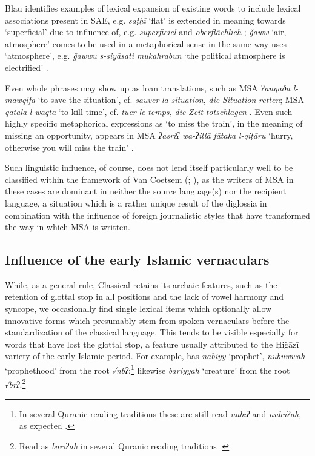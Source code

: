 \documentclass[output=paper]{langsci/langscibook}
\begin{document}
Blau identifies examples of lexical expansion of existing words to include lexical associations present in SAE, e.g. \textit{saṭḥī} ‘flat’ is extended in meaning towards ‘superficial’ due to influence of, e.g.   \textit{superficiel} and  \textit{oberflächlich} \citep[65]{Blau1969}; \textit{ǧaww} ‘air, atmosphere’ comes to be used in a metaphorical sense in the same way  uses ‘atmosphere’, e.g. \textit{ǧawwu} \textit{s-siyāsati} \textit{mukahrabun} ‘the political atmosphere is electrified’ \citep[69]{Blau1969}.

Even whole phrases may show up as loan translations, such as MSA \textit{ʔanqaða} \textit{l-mawqifa} ‘to save the situation’, cf.  \textit{sauver} \textit{la} \textit{situation},  \textit{die} \textit{Situation} \textit{retten}; MSA \textit{qatala} \textit{l-waqta} ‘to kill time’, cf.  \textit{tuer} \textit{le} \textit{temps,}  \textit{die} \textit{Zeit} \textit{totschlagen} \citep[76]{Blau1969}. Even such highly specific metaphorical expressions as ‘to miss the train’, in the meaning of missing an opportunity, appears in MSA \textit{ʔasriʕ} \textit{wa-ʔillā} \textit{fātaka} \textit{l-qiṭāru} ‘hurry, otherwise you will miss the train’ \citep[101]{Blau1969}.

Such linguistic influence, of course, does not lend itself particularly well to be classified within the framework of Van Coetsem (\citeyear{VanCoetsem1988}; \citeyear{VanCoetsem2000}), as the writers of MSA in these cases are dominant in neither the {source language}(s) nor the {recipient language}, a situation which is a rather unique result of the  {diglossia} in combination with the influence of foreign journalistic styles that have transformed the way in which MSA is written.

\subsection{\label{bkm:Ref13224870}Influence of the early Islamic vernaculars}

While, as a general rule, Classical  retains its archaic features, such as the retention of glottal stop in all positions and the lack of vowel harmony and syncope, we occasionally find single lexical items which optionally allow innovative forms which presumably {stem} from spoken vernaculars before the standardization of the classical language. This tends to be visible especially for words that have lost the glottal stop, a feature usually attributed to the Ḥiǧāzī variety of the early Islamic period. For example,  has \textit{nabiyy} ‘prophet’, \textit{nubuwwah} ‘prophethood’ from the {root} \textit{√nbʔ};\footnote{In several Quranic reading traditions these are still read \textit{nabīʔ} and \textit{nubūʔah}, as expected \citep[106--107]{IbnMujahid}.} likewise \textit{bariyyah} ‘creature’ from the {root} \textit{√brʔ}.\footnote{Read as \textit{barīʔah} in several Quranic reading traditions \citep[693]{IbnMujahid}.}
\end{document}
